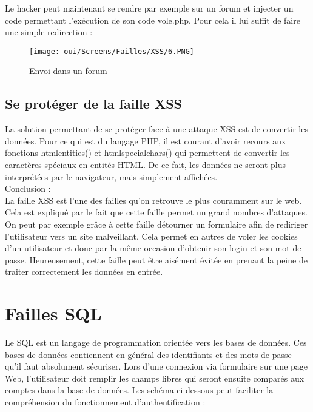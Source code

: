 Le hacker peut maintenant se rendre par exemple sur un forum et injecter un code permettant l'exécution de son code vole.php. Pour cela il lui suffit de faire une simple redirection :

\begin{figure}[htp!]
  \centering
  \setlength\figureheight{7cm}
  \setlength\figurewidth{9cm}
  \texttt{[image: oui/Screens/Failles/XSS/6.PNG]}
  \caption{Envoi dans un forum}
  \label{fig:courbe-tikz}
\end{figure}

\subsection{Se protéger de la faille XSS}

La solution permettant de se protéger face à une attaque XSS est de convertir les données. Pour ce qui est du langage PHP, il est courant d’avoir recours aux fonctions htmlentities() et htmlspecialchars() qui permettent de convertir les caractères spéciaux en entités HTML. De ce fait, les données ne seront plus interprétées par le navigateur, mais simplement affichées.\\

Conclusion : \\

La faille XSS est l’une des failles qu’on retrouve le plus couramment sur le web. Cela est expliqué par le fait que cette faille permet un grand nombres d’attaques. On peut par exemple grâce à cette faille détourner un formulaire afin de rediriger l’utilisateur vers un site malveillant. Cela permet en autres de voler les cookies d’un utilisateur et donc par la même occasion d’obtenir son login et son mot de passe.
Heureusement, cette faille peut être aisément évitée en prenant la peine de traiter correctement les données en entrée.

\section{Failles SQL}
Le SQL est un langage de programmation orientée vers les bases de données. Ces bases de données contiennent en général des identifiants et des mots de passe qu'il faut absolument sécuriser. Lors d'une connexion via formulaire sur une page Web, l'utilisateur doit remplir les champs libres qui seront ensuite comparés aux comptes dans la base de données. Les schéma ci-dessous peut faciliter la compréhension du fonctionnement d'authentification :


